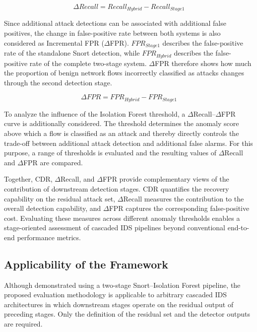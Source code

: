 \documentclass[conference]{IEEEtran}
\begin{document}
\begin{equation}
\Delta Recall = Recall_{Hybrid} - Recall_{Stage1}
\label{eq:delta-recall}
\end{equation}

Since additional attack detections can be associated with additional false positives, the change in false-positive rate between both systems is also considered as Incremental FPR ($\Delta$FPR). $FPR_{Stage1}$ describes the false-positive rate of the standalone Snort detection, while $FPR_{Hybrid}$ describes the false-positive rate of the complete two-stage system. $\Delta$FPR therefore shows how much the proportion of benign network flows incorrectly classified as attacks changes through the second detection stage.

\begin{equation}
\Delta FPR = FPR_{Hybrid} - FPR_{Stage1}
\label{eq:delta-fpr}
\end{equation}

To analyze the influence of the Isolation Forest threshold, a $\Delta$Recall--$\Delta$FPR curve is additionally considered. The threshold determines the anomaly score above which a flow is classified as an attack and thereby directly controls the trade-off between additional attack detection and additional false alarms. For this purpose, a range of thresholds is evaluated and the resulting values of $\Delta$Recall and $\Delta$FPR are compared.

Together, CDR, $\Delta$Recall, and $\Delta$FPR provide complementary views of
the contribution of downstream detection stages. CDR quantifies the recovery
capability on the residual attack set, $\Delta$Recall measures the contribution
to the overall detection capability, and $\Delta$FPR captures the corresponding
false-positive cost. Evaluating these measures across different anomaly
thresholds enables a stage-oriented assessment of cascaded IDS pipelines beyond
conventional end-to-end performance metrics.

\subsection{Applicability of the Framework}
Although demonstrated using a two-stage Snort–Isolation Forest pipeline, the proposed evaluation methodology is applicable to arbitrary cascaded IDS architectures in which downstream stages operate on the residual output of preceding stages. Only the definition of the residual set and the detector outputs are required.
\end{document}
